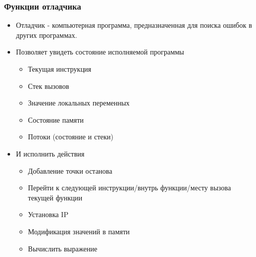 \begin{frame}
\frametitle{Функции отладчика} %
\begin{itemize}
	\item Отладчик - компьютерная программа, предназначенная для поиска ошибок в других программах.
	\item Позволяет увидеть состояние исполняемой программы
	\begin{itemize}
		\item Текущая инструкция
		\item Стек вызовов
		\item Значение локальных переменных
		\item Состояние памяти
		\item Потоки (состояние и стеки)
	\end{itemize}
	\item И исполнить действия
	\begin{itemize}
		\item Добавление точки останова
		\item Перейти к следующей инструкции/внутрь функции/месту вызова текущей функции
		\item Установка IP
		\item Модификация значений в памяти
		\item Вычислить выражение
	\end{itemize}
\end{itemize}
\end{frame}